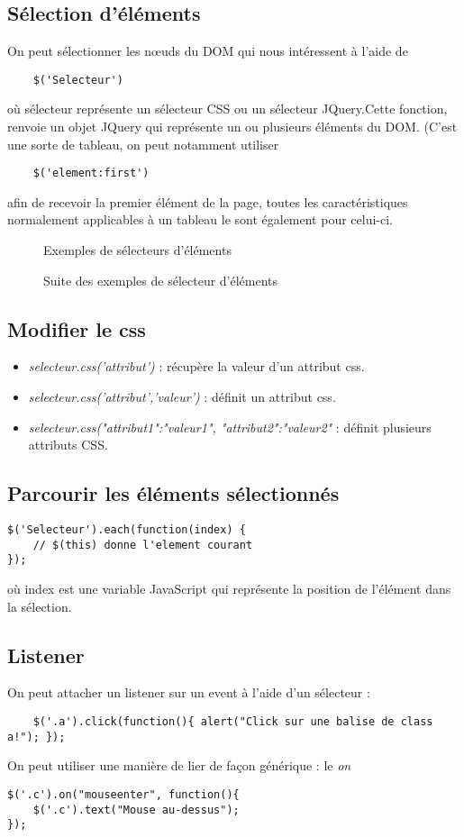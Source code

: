 \documentclass{article}[12pt]
\begin{document}
\subsection{Sélection d'éléments}
On peut sélectionner les nœuds du DOM qui nous intéressent à l'aide de 
\begin{lstlisting}
	$('Selecteur')
\end{lstlisting} 
où sélecteur représente un sélecteur CSS ou un sélecteur JQuery.Cette fonction, renvoie un objet JQuery qui représente un ou plusieurs éléments du DOM. (C'est une sorte de tableau, on peut notamment utiliser \begin{lstlisting}
	$('element:first')
\end{lstlisting} afin de recevoir la premier élément de la page, toutes les caractéristiques normalement applicables à un tableau le sont également pour celui-ci.
\begin{figure}[H]
	\centering
    \caption{Exemples de sélecteurs d'éléments}
\end{figure}
\begin{figure}[H]
	\centering
    \caption{Suite des exemples de sélecteur d'éléments}
\end{figure}
\subsection{Modifier le css}
\begin{itemize}
	\item \emph{selecteur.css('attribut')} : récupère la valeur d'un attribut css.
    \item \emph{selecteur.css('attribut','valeur')} : définit un attribut css.
    \item \emph{selecteur.css({"attribut1":"valeur1",
    							"attribut2":"valeur2"}} : définit plusieurs attributs CSS.
\end{itemize}
\subsection{Parcourir les éléments sélectionnés}
\begin{lstlisting}
$('Selecteur').each(function(index) {
	// $(this) donne l'element courant
});
\end{lstlisting}
où index est une variable JavaScript qui représente la position de l'élément dans la sélection.
\subsection{Listener}
On peut attacher un listener sur un event à l'aide d'un sélecteur :
\begin{lstlisting}
	$('.a').click(function(){ alert("Click sur une balise de class a!"); });
\end{lstlisting}
On peut utiliser une manière de lier de façon générique : le \emph{on}
\begin{lstlisting}
$('.c').on("mouseenter", function(){
	$('.c').text("Mouse au-dessus");
});
\end{lstlisting}
\end{document}
